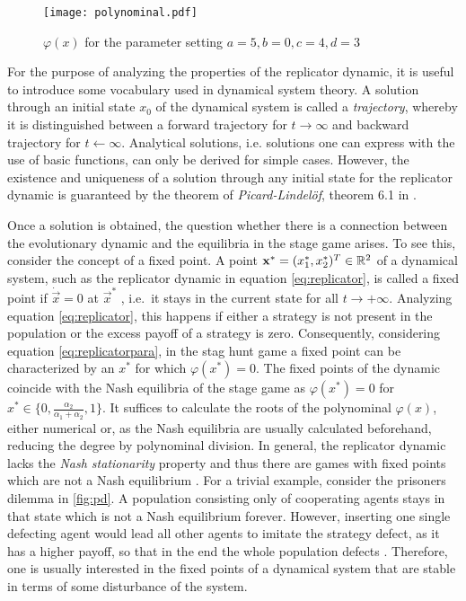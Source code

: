 \begin{figure}[h]
        \centering
        \texttt{[image: polynominal.pdf]}
        \caption[Polynominal of the Replicator Dynamic]{$\varphi(x)$ for the parameter setting $a=5, b=0, c=4, d=3$}
        \label{fig:polynominal}
\end{figure}
For the purpose of analyzing the properties of the replicator dynamic, it is 
useful to introduce some vocabulary used in dynamical system theory. 
A solution through an initial state $x_0$ of the dynamical system is called a 
\textit{trajectory}, whereby it is distinguished between a forward trajectory 
for $t \rightarrow \infty$ and backward trajectory for $t \leftarrow \infty$.
Analytical solutions, i.e. solutions one can express with the use of
basic functions, can only be derived for simple cases. 
However, the existence and uniqueness of a solution through
any initial state for the replicator dynamic is guaranteed by the theorem 
of \textit{Picard-Lindel\"of}, theorem 6.1 in 
\textcite[74]{weibull_evolutionary_1997}. 

Once a solution is obtained, the question whether there 
is a connection between the evolutionary dynamic and the equilibria in the 
stage game arises. To see this, consider the concept of a fixed point.
A point $\mathbf{x}^*=(x^*_1,x^*_2)^T \in \mathbb{R}^2$ of a dynamical system, such as the replicator 
dynamic in equation \eqref{eq:replicator}, is called a fixed point
if $\dot{\vec{x}} = 0$ at $\vec{x}^*$ , i.e.\ it stays in the 
current state for all $t \rightarrow + \infty $. 
Analyzing equation \eqref{eq:replicator}, 
this happens if either a strategy
is not present in the population or the excess payoff of a strategy is zero. 
Consequently, considering equation \eqref{eq:replicatorpara}, in the stag 
hunt game a fixed point can be characterized by an $x^*$ for which
$\varphi(x^*) = 0$.
The fixed points of the dynamic coincide 
with the Nash equilibria of the stage game as 
$\varphi(x^*) = 0$ for $x^* \in \{0,\frac{\alpha_2}{\alpha_1+\alpha_2},1\}$. 
It suffices to calculate the roots of the polynominal $\varphi(x)$, either
numerical or, as the Nash equilibria are usually calculated beforehand,
reducing the degree by polynominal division. In general, the replicator 
dynamic lacks the \textit{Nash stationarity} property and thus there are 
games with fixed points which are not a Nash equilibrium
\parencite{sandholm_population_2010}.
For a trivial example, consider the prisoners dilemma in \ref{fig:pd}. 
A population consisting only of cooperating agents stays in that state
which is not a Nash equilibrium forever. However, inserting one single 
defecting agent would lead all other agents to imitate the strategy defect,
as it has a higher payoff, so that in the end the whole population defects .
Therefore, one is usually interested in the fixed points of 
a dynamical system that are stable in terms of some 
disturbance of the system. 

